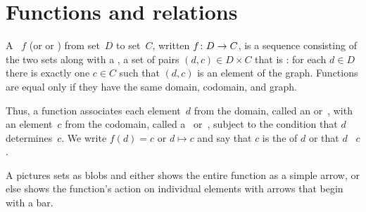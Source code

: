 \documentclass{ibl}  %
\begin{document}
\chapter{Functions and relations}
\begin{df}
A ~$f$ (or  or ) 
from  set~$D$
to  set~$C$, written $\mbox{$f\colon D\to C$}$,
is a sequence consisting of the two sets along with a , 
a set of pairs $(d,c)\in D\times C$ that is 
: for each $d\in D$ there is
exactly one $c\in C$ such that $(d,c)$ is an element of the graph. 
Functions are equal only if they have the same domain, codomain,
and graph.
\end{df}

\noindent Thus, a function associates each element~$d$ from the domain,
called an  or~,
with an element~$c$ from the codomain, 
called a~ or~,
subject to the condition that $d$ determines~$c$. 
We write $f(d)=c$ or $d\mapsto c$ 
and say that $c$ is the  of $d$ 
or that $d$ ~$c$.

A  pictures sets as blobs and 
either shows the entire function as a simple arrow,   
or else shows the function's action on individual elements 
with arrows that begin with a bar.
\begin{center}
  \hspace{8em}
\end{center}
\end{document}
